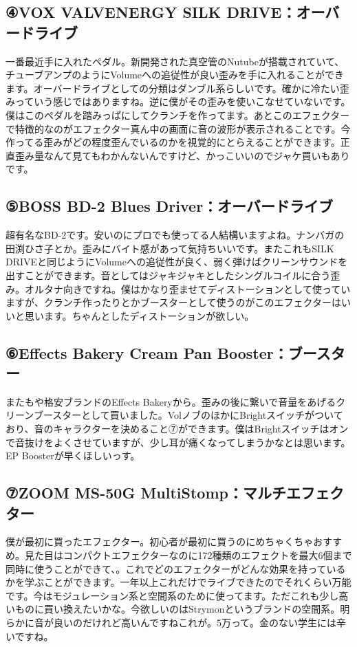 \subsection{④VOX VALVENERGY SILK DRIVE：オーバードライブ}

一番最近手に入れたペダル。新開発された真空管のNutubeが搭載されていて、チューブアンプのようにVolumeへの追従性が良い歪みを手に入れることができます。オーバードライブとしての分類はダンブル系らしいです。確かに冷たい歪みっていう感じではありますね。逆に僕がその歪みを使いこなせていないです。僕はこのペダルを踏みっぱにしてクランチを作ってます。あとこのエフェクターで特徴的なのがエフェクター真ん中の画面に音の波形が表示されることです。今作ってる歪みがどの程度歪んでいるのかを視覚的にとらえることができます。正直歪み量なんて見てもわかんないんですけど、かっこいいのでジャケ買いもありです。

\subsection{⑤BOSS BD-2 Blues Driver：オーバードライブ}

超有名なBD-2です。安いのにプロでも使ってる人結構いますよね。ナンバガの田渕ひさ子とか。歪みにバイト感があって気持ちいいです。またこれもSILK DRIVEと同じようにVolumeへの追従性が良く、弱く弾けばクリーンサウンドを出すことができます。音としてはジャキジャキとしたシングルコイルに合う歪み。オルタナ向きですね。僕はかなり歪ませてディストーションとして使っていますが、クランチ作ったりとかブースターとして使うのがこのエフェクターはいいと思います。ちゃんとしたディストーションが欲しい。

\subsection{⑥Effects Bakery Cream Pan Booster：ブースター}

またもや格安ブランドのEffects Bakeryから。歪みの後に繋いで音量をあげるクリーンブースターとして買いました。VolノブのほかにBrightスイッチがついており、音のキャラクターを決めること⑦ができます。僕はBrightスイッチはオンで音抜けをよくさせていますが、少し耳が痛くなってしまうかなとは思います。EP Boosterが早くほしいっす。

\subsection{⑦ZOOM MS-50G MultiStomp：マルチエフェクター}

僕が最初に買ったエフェクター。初心者が最初に買うのにめちゃくちゃおすすめ。見た目はコンパクトエフェクターなのに172種類のエフェクトを最大6個まで同時に使うことができて、。これでどのエフェクターがどんな効果を持っているかを学ぶことができます。一年以上これだけでライブできたのでそれくらい万能です。今はモジュレーション系と空間系のために使ってます。ただこれも少し高いものに買い換えたいかな。今欲しいのはStrymonというブランドの空間系。明らかに音が良いのだけれど高いんですねこれが。5万って。金のない学生には辛いですね。

